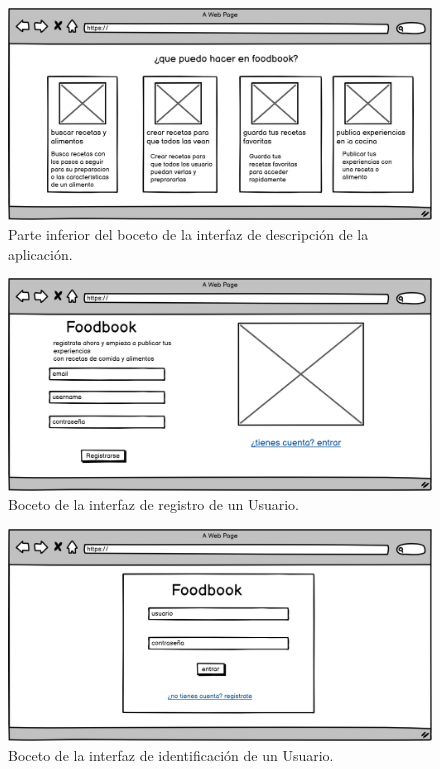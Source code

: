 \begin{figure}[H]
    \centering
    \includegraphics[scale=0.20]{img/descripcion-aplicacion2.jpg}
    \caption{Parte inferior del boceto de la interfaz de descripción de la aplicación.}
    \label{fig:descripcion-aplicacion2}
\end{figure}



 
    
\begin{figure}[H]
    \centering
    \includegraphics[scale=0.20]{img/registro-usuario.jpg}
    \caption{Boceto de la interfaz de registro de un Usuario.}
    \label{fig:registro-usuario}
\end{figure}
 

\begin{figure}[H]
    \centering
    \includegraphics[scale=0.20]{img/identificacion-usuario.jpg}
    \caption{Boceto de la interfaz de identificación de un Usuario.}
    \label{fig:identificacion-usuario}
\end{figure}

